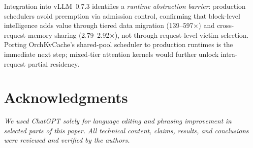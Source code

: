 \documentclass[conference]{IEEEtran}
\begin{document}
Integration into vLLM~0.7.3 identifies a \emph{runtime abstraction barrier}: production schedulers avoid preemption via admission control, confirming that block-level intelligence adds value through tiered data migration (139--597$\times$) and cross-request memory sharing (2.79--2.92$\times$), not through request-level victim selection. Porting OrchKvCache's shared-pool scheduler to production runtimes is the immediate next step; mixed-tier attention kernels would further unlock intra-request partial residency.

\section*{Acknowledgments}
\textit{We used ChatGPT solely for language editing and phrasing improvement in selected parts of this paper. All technical content, claims, results, and conclusions were reviewed and verified by the authors.}
\end{document}
